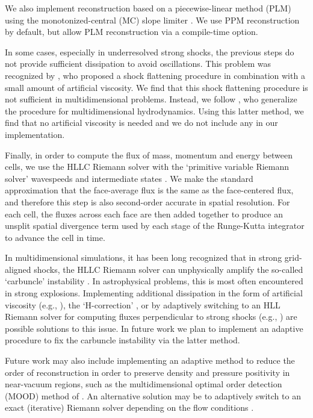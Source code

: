 \documentclass[fleqn,usenatbib]{mnras}
\begin{document}
We also implement reconstruction based on a piecewise-linear method (PLM) using the monotonized-central (MC) slope limiter \citep{VanLeer_1977}. We use PPM reconstruction by default, but allow PLM reconstruction via a compile-time option.

In some cases, especially in underresolved strong shocks, the previous steps do not provide sufficient dissipation to avoid oscillations. This problem was recognized by , who proposed a shock flattening procedure in combination with a small amount of artificial viscosity. We find that this shock flattening procedure is not sufficient in multidimensional problems. Instead, we follow \cite{Miller_2002}, who generalize the  procedure for multidimensional hydrodynamics. Using this latter method, we find that no artificial viscosity is needed and we do not include any in our implementation.

Finally, in order to compute the flux of mass, momentum and energy between cells, we use the HLLC Riemann solver with the `primitive variable Riemann solver' wavespeeds and intermediate states \citep{Toro_2013}. We make the standard approximation that the face-average flux is the same as the face-centered flux, and therefore this step is also second-order accurate in spatial resolution. For each cell, the fluxes across each face are then added together to produce an unsplit spatial divergence term used by each stage of the Runge-Kutta integrator to advance the cell in time.

In multidimensional simulations, it has been long recognized that in strong grid-aligned shocks, the HLLC Riemann solver can unphysically amplify the so-called `carbuncle' instability \citep{Quirk_1994}. In astrophysical problems, this is most often encountered in strong explosions. Implementing additional dissipation in the form of artificial viscosity (e.g., \citealt{Gittings_2008}), the `H-correction' \citep{Sanders_1998}, or by adaptively switching to an HLL Riemann solver for computing fluxes perpendicular to strong shocks (e.g., \citealt{Quirk_1994,Skinner_2019}) are possible solutions to this issue. In future work we plan to implement an adaptive procedure to fix the carbuncle instability via the latter method.

Future work may also include implementing an adaptive method to reduce the order of reconstruction in order to preserve density and pressure positivity in near-vacuum regions, such as the multidimensional optimal order detection (MOOD) method of \cite{Clain_2011}. An alternative solution may be to adaptively switch to an exact (iterative) Riemann solver depending on the flow conditions \citep{Toro_2013}.
\end{document}

